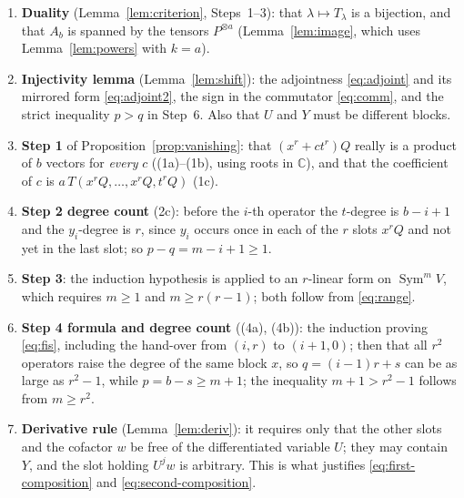 \documentclass[11pt]{article}
\theoremstyle{remark}
\DeclareMathOperator{\Sym}{Sym}
\newcommand{\C}{\mathbb C}
\begin{document}
\begin{enumerate}[leftmargin=2em]
\item \textbf{Duality} (Lemma~\ref{lem:criterion}, Steps~1--3): that
$\lambda\mapsto T_\lambda$ is a bijection, and that $A_b$ is spanned by
the tensors $P^{\otimes a}$ (Lemma~\ref{lem:image}, which uses
Lemma~\ref{lem:powers} with $k=a$).
\item \textbf{Injectivity lemma} (Lemma~\ref{lem:shift}): the adjointness
\eqref{eq:adjoint} and its mirrored form \eqref{eq:adjoint2}, the sign in
the commutator \eqref{eq:comm}, and the strict inequality $p>q$ in Step~6.
Also that $U$ and $Y$ must be different blocks.
\item \textbf{Step 1} of Proposition~\ref{prop:vanishing}: that
$(x^r+ct^r)Q$ really is a product of $b$ vectors for \emph{every} $c$
((1a)--(1b), using roots in $\C$), and that the coefficient of $c$ is
$a\,T(x^rQ,\dots,x^rQ,t^rQ)$ (1c).
\item \textbf{Step 2 degree count} (2c): before the $i$-th operator the
$t$-degree is $b-i+1$ and the $y_i$-degree is $r$, since $y_i$ occurs once
in each of the $r$ slots $x^rQ$ and not yet in the last slot; so
$p-q=m-i+1\ge1$.
\item \textbf{Step 3}: the induction hypothesis is applied to an $r$-linear
form on $\Sym^mV$, which requires $m\ge1$ and $m\ge r(r-1)$; both follow
from \eqref{eq:range}.
\item \textbf{Step 4 formula and degree count} ((4a), (4b)): the induction
proving \eqref{eq:fis}, including the hand-over from $(i,r)$ to $(i+1,0)$;
then that all $r^2$ operators raise the degree of the same block $x$, so
$q=(i-1)r+s$ can be as large as $r^2-1$, while $p=b-s\ge m+1$; the
inequality $m+1>r^2-1$ follows from $m\ge r^2$.
\item \textbf{Derivative rule} (Lemma~\ref{lem:deriv}): it requires only
that the other slots and the cofactor $w$ be free of the differentiated
variable $U$; they may contain $Y$, and the slot holding $U^jw$ is
arbitrary. This is what justifies \eqref{eq:first-composition} and
\eqref{eq:second-composition}.
\end{enumerate}
\end{document}
